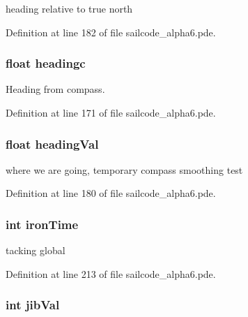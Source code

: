 heading relative to true north 



\-Definition at line 182 of file sailcode\-\_\-alpha6.\-pde.

\hypertarget{group__group1_ga4736792191ccbbbb7b3d6933a3302336}{
\subsubsection[{headingc}]{\setlength{\rightskip}{0pt plus 5cm}float {\bf headingc}}}
\label{group__group1_ga4736792191ccbbbb7b3d6933a3302336}


\-Heading from compass. 



\-Definition at line 171 of file sailcode\-\_\-alpha6.\-pde.

\hypertarget{group__group1_ga8d6cfa64e358c393d2d13c5a9803e052}{
\subsubsection[{heading\-Val}]{\setlength{\rightskip}{0pt plus 5cm}float {\bf heading\-Val}}}
\label{group__group1_ga8d6cfa64e358c393d2d13c5a9803e052}


where we are going, temporary compass smoothing test 



\-Definition at line 180 of file sailcode\-\_\-alpha6.\-pde.

\hypertarget{group__group1_ga332365589e9af9d8ec4d1c5663034132}{
\subsubsection[{iron\-Time}]{\setlength{\rightskip}{0pt plus 5cm}int {\bf iron\-Time}}}
\label{group__group1_ga332365589e9af9d8ec4d1c5663034132}


tacking global 



\-Definition at line 213 of file sailcode\-\_\-alpha6.\-pde.

\hypertarget{group__group1_ga1fee0a7eb4ae243dcc5afe20f508990e}{
\subsubsection[{jib\-Val}]{\setlength{\rightskip}{0pt plus 5cm}int {\bf jib\-Val}}}
\label{group__group1_ga1fee0a7eb4ae243dcc5afe20f508990e}


